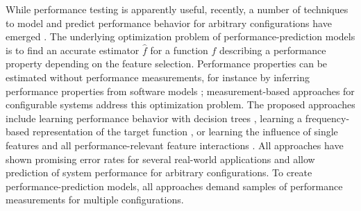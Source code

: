 While performance testing is apparently useful, recently, a number of techniques
to model and predict performance behavior for arbitrary configurations have
emerged
\citep{siegmund_predicting_2012,siegmund_performance-influence_2015,guo_variability-aware_2013,sarkar_cost-efficient_2015}.
The underlying optimization problem of performance-prediction models is to find an accurate estimator $\hat{f}$ for a function $f$ describing a performance
property depending on the feature selection. Performance properties can be
estimated without performance measurements, for instance by inferring
performance properties from software models \citep{woodside_future_2007};
measurement-based approaches for configurable systems address this optimization
problem.  The proposed approaches include learning performance behavior with decision trees
\citep{guo_variability-aware_2013,sarkar_cost-efficient_2015}, learning a frequency-based representation
of the target function \citep{zhang_performance_2015}, or learning the
influence of single features and all performance-relevant feature interactions
\citep{siegmund_predicting_2012,siegmund_performance-influence_2015}. All
approaches have shown promising error rates for several real-world applications
and allow prediction of system performance for arbitrary configurations.
To create performance-prediction models, all approaches demand samples of
performance measurements for multiple configurations.

